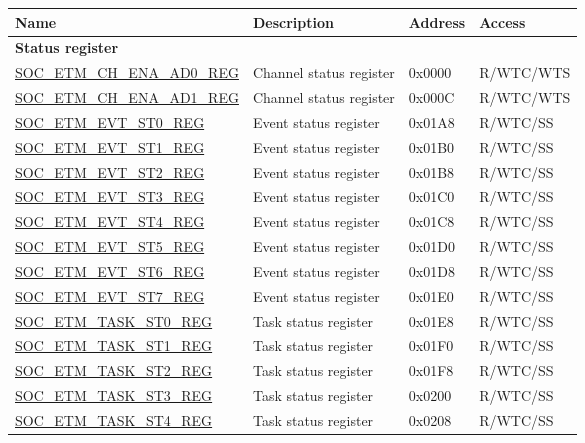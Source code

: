 \begin{longtable}{ | p{6cm} | p{6.4cm} | p{1.3cm} | p{1.8cm} | }
\hline\rowcolor{lightgray}
\textbf{Name} & \textbf{Description} &  \textbf{Address} & \textbf{Access} \\ \hline
\endhead
\multicolumn{4}{|l|}{\textbf{Status register}} \\ \hline
\hyperref[regdesc:SOCETMCHENAAD0REG]{SOC\_ETM\_CH\_ENA\_AD0\_REG} & Channel status register & 0x0000 & R/WTC/WTS \\ \hline
\hyperref[regdesc:SOCETMCHENAAD1REG]{SOC\_ETM\_CH\_ENA\_AD1\_REG} & Channel status register & 0x000C & R/WTC/WTS \\ \hline
\hyperref[regdesc:SOCETMEVTST0REG]{SOC\_ETM\_EVT\_ST0\_REG} & Event status register & 0x01A8 & R/WTC/SS \\ \hline
\hyperref[regdesc:SOCETMEVTST1REG]{SOC\_ETM\_EVT\_ST1\_REG} & Event status register & 0x01B0 & R/WTC/SS \\ \hline
\hyperref[regdesc:SOCETMEVTST2REG]{SOC\_ETM\_EVT\_ST2\_REG} & Event status register & 0x01B8 & R/WTC/SS \\ \hline
\hyperref[regdesc:SOCETMEVTST3REG]{SOC\_ETM\_EVT\_ST3\_REG} & Event status register & 0x01C0 & R/WTC/SS \\ \hline
\hyperref[regdesc:SOCETMEVTST4REG]{SOC\_ETM\_EVT\_ST4\_REG} & Event status register & 0x01C8 & R/WTC/SS \\ \hline
\hyperref[regdesc:SOCETMEVTST5REG]{SOC\_ETM\_EVT\_ST5\_REG} & Event status register & 0x01D0 & R/WTC/SS \\ \hline
\hyperref[regdesc:SOCETMEVTST6REG]{SOC\_ETM\_EVT\_ST6\_REG} & Event status register & 0x01D8 & R/WTC/SS \\ \hline
\hyperref[regdesc:SOCETMEVTST7REG]{SOC\_ETM\_EVT\_ST7\_REG} & Event status register & 0x01E0 & R/WTC/SS \\ \hline
\hyperref[regdesc:SOCETMTASKST0REG]{SOC\_ETM\_TASK\_ST0\_REG} & Task status register & 0x01E8 & R/WTC/SS \\ \hline
\hyperref[regdesc:SOCETMTASKST1REG]{SOC\_ETM\_TASK\_ST1\_REG} & Task status register & 0x01F0 & R/WTC/SS \\ \hline
\hyperref[regdesc:SOCETMTASKST2REG]{SOC\_ETM\_TASK\_ST2\_REG} & Task status register & 0x01F8 & R/WTC/SS \\ \hline
\hyperref[regdesc:SOCETMTASKST3REG]{SOC\_ETM\_TASK\_ST3\_REG} & Task status register & 0x0200 & R/WTC/SS \\ \hline
\hyperref[regdesc:SOCETMTASKST4REG]{SOC\_ETM\_TASK\_ST4\_REG} & Task status register & 0x0208 & R/WTC/SS \\ \hline

\end{longtable}
